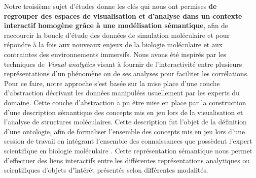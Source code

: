 

Notre troisième sujet d'études donne les clés qui nous ont permises \textbf{de regrouper des espaces de visualisation et d'analyse dans un contexte interactif homogène grâce à une modélisation sémantique}, afin de raccourcir la boucle d'étude des données de simulation moléculaire et pour répondre à la fois aux nouveaux enjeux de la biologie moléculaire et aux contraintes des environnements immersifs. %
Nous avons été inspirés par les techniques de \textit{Visual analytics} visant à fournir de l'interactivité entre plusieurs représentations d'un phénomène ou de ses analyses pour faciliter les corrélations\cite{kielman2009foundations}.
Pour ce faire, notre approche s'est basée sur la mise place d'une couche d'abstraction décrivant les données manipulées usuellement par les experts du domaine. Cette couche d'abstraction a pu être mise en place par la construction d'une description sémantique des concepts mis en jeu lors de la visualisation et l'analyse de structures moléculaires. Cette description fut l'objet de la définition d'une ontologie, afin de formaliser l'ensemble des concepts mis en jeu lors d'une session de travail en intégrant l'ensemble des connaissances que possèdent l'expert scientifique en biologie moléculaire \cite{berners2001semantic}. Cette représentation sémantique nous permet d'effectuer des liens interactifs entre les différentes représentations analytiques ou scientifiques d'objets d"intérêt présentés selon différentes modalités.

